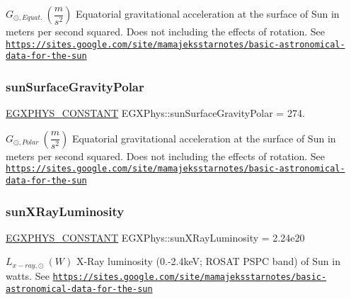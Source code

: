 $ G_{\odot,Equat.} \ (\dfrac{m}{s^2})$ Equatorial gravitational acceleration at the surface of Sun in meters per second squared. Does not including the effects of rotation. See \href{https://sites.google.com/site/mamajeksstarnotes/basic-astronomical-data-for-the-sun}{\tt https\+://sites.\+google.\+com/site/mamajeksstarnotes/basic-\/astronomical-\/data-\/for-\/the-\/sun} \mbox{\label{group___e_g_x_phys-_constants-_astrophysics-_solar_system-_sun-_bulk_gae9187886dbbd7298e5a1d257a2365e9f}} 
\subsubsection{\texorpdfstring{sun\+Surface\+Gravity\+Polar}{sunSurfaceGravityPolar}}
{\footnotesize\ttfamily \mbox{\hyperlink{group___e_g_x_phys-_constants-_macros_ga76980d288494ce1714c9ac68a95ba702}{E\+G\+X\+P\+H\+Y\+S\+\_\+\+C\+O\+N\+S\+T\+A\+NT}} E\+G\+X\+Phys\+::sun\+Surface\+Gravity\+Polar = 274.}

$ G_{\odot,Polar} \ (\dfrac{m}{s^2})$ Equatorial gravitational acceleration at the surface of Sun in meters per second squared. Does not including the effects of rotation. See \href{https://sites.google.com/site/mamajeksstarnotes/basic-astronomical-data-for-the-sun}{\tt https\+://sites.\+google.\+com/site/mamajeksstarnotes/basic-\/astronomical-\/data-\/for-\/the-\/sun} \mbox{\label{group___e_g_x_phys-_constants-_astrophysics-_solar_system-_sun-_bulk_ga088d6c6b1f9cc7098af2da77e94a386a}} 
\subsubsection{\texorpdfstring{sun\+X\+Ray\+Luminosity}{sunXRayLuminosity}}
{\footnotesize\ttfamily \mbox{\hyperlink{group___e_g_x_phys-_constants-_macros_ga76980d288494ce1714c9ac68a95ba702}{E\+G\+X\+P\+H\+Y\+S\+\_\+\+C\+O\+N\+S\+T\+A\+NT}} E\+G\+X\+Phys\+::sun\+X\+Ray\+Luminosity = 2.\+24e20}

$L_{x-ray,\odot} \ (W)$ X-\/\+Ray luminosity (0.-\/2.\+4keV; R\+O\+S\+AT P\+S\+PC band) of Sun in watts. See \href{https://sites.google.com/site/mamajeksstarnotes/basic-astronomical-data-for-the-sun}{\tt https\+://sites.\+google.\+com/site/mamajeksstarnotes/basic-\/astronomical-\/data-\/for-\/the-\/sun} 